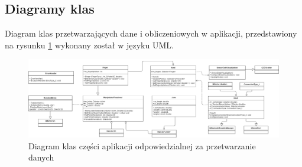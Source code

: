 \documentclass[12pt,a4paper]{article}
\begin{document}
\newpage
\subsection{Diagramy klas}
Diagram klas przetwarzających dane i obliczeniowych w aplikacji, przedstawiony na rysunku \ref{fig:classdiagram} wykonany został w języku UML.\\
\begin{figure}[!htb]
\centering
\includegraphics[angle=90,height=0.8\textheight]{./ClassDiagram.png}
\caption{Diagram klas części aplikacji odpowiedzialnej za przetwarzanie danych\label{fig:classdiagram}}
\end{figure}
\end{document}
